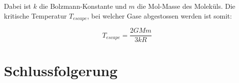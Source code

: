 \begin{refsection}
Dabei ist $k$ die Bolzmann-Konstante und $m$ die Mol-Masse des Moleküls. Die kritische Temperatur $T_{escape}$, bei welcher Gase abgestossen werden ist somit:

\begin{equation}
T_{escape} = \frac{2GMm}{3kR}
\end{equation}








\section{Schlussfolgerung}

\printbibliography[heading=subbibliography]
\end{refsection}
